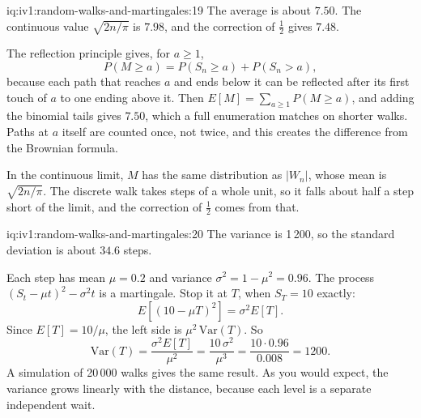 \begin{solution}{iq:iv1:random-walks-and-martingales:19}
The average is about $7.50$. The continuous value $\sqrt{2n/\pi}$ is $7.98$, and the correction of $\tfrac12$ gives $7.48$.

The reflection principle gives, for $a \ge 1$,
\[
P(M \ge a) = P(S_n \ge a) + P(S_n > a),
\]
because each path that reaches $a$ and ends below it can be reflected after its first touch of $a$ to one ending above it. Then $E[M] = \sum_{a \ge 1} P(M \ge a)$, and adding the binomial tails gives $7.50$, which a full enumeration matches on shorter walks. Paths at $a$ itself are counted once, not twice, and this creates the difference from the Brownian formula.

In the continuous limit, $M$ has the same distribution as $|W_n|$, whose mean is $\sqrt{2n/\pi}$. The discrete walk takes steps of a whole unit, so it falls about half a step short of the limit, and the correction of $\tfrac12$ comes from that.

\end{solution}

\begin{solution}{iq:iv1:random-walks-and-martingales:20}
The variance is 1\,200, so the standard deviation is about $34.6$ steps.

Each step has mean $\mu = 0.2$ and variance $\sigma^2 = 1 - \mu^2 = 0.96$. The process $(S_t - \mu t)^2 - \sigma^2 t$ is a martingale. Stop it at $T$, when $S_T = 10$ exactly:
\[
E[(10 - \mu T)^2] = \sigma^2 E[T].
\]
Since $E[T] = 10/\mu$, the left side is $\mu^2\,\mathrm{Var}(T)$. So
\[
\mathrm{Var}(T) = \frac{\sigma^2 E[T]}{\mu^2} = \frac{10\,\sigma^2}{\mu^3} = \frac{10 \cdot 0.96}{0.008} = 1200.
\]
A simulation of 20\,000 walks gives the same result. As you would expect, the variance grows linearly with the distance, because each level is a separate independent wait.

\end{solution}

